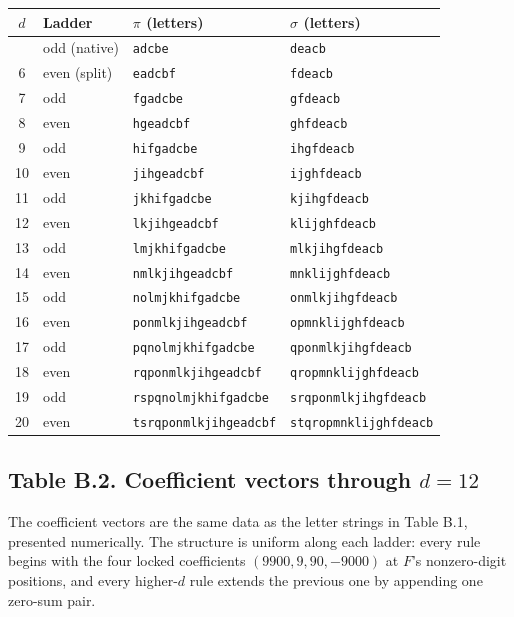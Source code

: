 \documentclass[11pt,letterpaper]{article}
\theoremstyle{paperstyle}
\theoremstyle{paperstyledef}
\theoremstyle{paperstylerem}
\begin{document}
\begin{longtable}[]{@{}clll@{}}
\toprule\noalign{}
\(d\) & Ladder & \(\pi\) (letters) & \(\sigma\) (letters) \\
\midrule\noalign{}
\endhead
\bottomrule\noalign{}
\endlastfoot
5 & odd (native) & \texttt{adcbe} & \texttt{deacb} \\
6 & even (split) & \texttt{eadcbf} & \texttt{fdeacb} \\
7 & odd & \texttt{fgadcbe} & \texttt{gfdeacb} \\
8 & even & \texttt{hgeadcbf} & \texttt{ghfdeacb} \\
9 & odd & \texttt{hifgadcbe} & \texttt{ihgfdeacb} \\
10 & even & \texttt{jihgeadcbf} & \texttt{ijghfdeacb} \\
11 & odd & \texttt{jkhifgadcbe} & \texttt{kjihgfdeacb} \\
12 & even & \texttt{lkjihgeadcbf} & \texttt{klijghfdeacb} \\
13 & odd & \texttt{lmjkhifgadcbe} & \texttt{mlkjihgfdeacb} \\
14 & even & \texttt{nmlkjihgeadcbf} & \texttt{mnklijghfdeacb} \\
15 & odd & \texttt{nolmjkhifgadcbe} & \texttt{onmlkjihgfdeacb} \\
16 & even & \texttt{ponmlkjihgeadcbf} & \texttt{opmnklijghfdeacb} \\
17 & odd & \texttt{pqnolmjkhifgadcbe} & \texttt{qponmlkjihgfdeacb} \\
18 & even & \texttt{rqponmlkjihgeadcbf} & \texttt{qropmnklijghfdeacb} \\
19 & odd & \texttt{rspqnolmjkhifgadcbe} &
\texttt{srqponmlkjihgfdeacb} \\
20 & even & \texttt{tsrqponmlkjihgeadcbf} &
\texttt{stqropmnklijghfdeacb} \\
\end{longtable}

\hypertarget{table-b.2.-coefficient-vectors-through-d-12}{%
\subsection{\texorpdfstring{Table B.2. Coefficient vectors through \(d = 12\)}{Table B.2. Coefficient vectors through d = 12}}\label{table-b.2.-coefficient-vectors-through-d-12}}

The coefficient vectors are the same data as the letter strings in Table
B.1, presented numerically. The structure is uniform along each ladder:
every rule begins with the four locked coefficients
\((9900, 9, 90, -9000)\) at \(F\)'s nonzero-digit positions, and every
higher-\(d\) rule extends the previous one by appending one zero-sum
pair.
\end{document}
